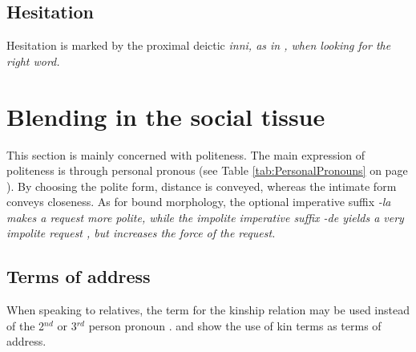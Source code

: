 

\subsection{Hesitation}
Hesitation is marked by the proximal deictic \em inni\em, as in , when looking for the right word.




\section{Blending in the social tissue}\label{sec:pragm:Blendinginthesocialtissue}
This section is mainly concerned with politeness. The main expression of politeness is through personal pronous (see Table \ref{tab:PersonalPronouns} on page \pageref{tab:PersonalPronouns}). By choosing the polite form, distance is conveyed, whereas the intimate form conveys closeness. As for bound morphology, the optional imperative suffix \em -la \em  {} makes a request more polite, while the impolite imperative suffix \em -de \em {} yields a very impolite request , but increases the force of the request.

\subsection{Terms of address}
When speaking to  relatives, the term for the kinship relation may be used instead of the 2$^{nd}$ or 3$^{rd}$ person pronoun \citep[55]{Saldin2001}.   and  show the use of kin terms as terms of address.




